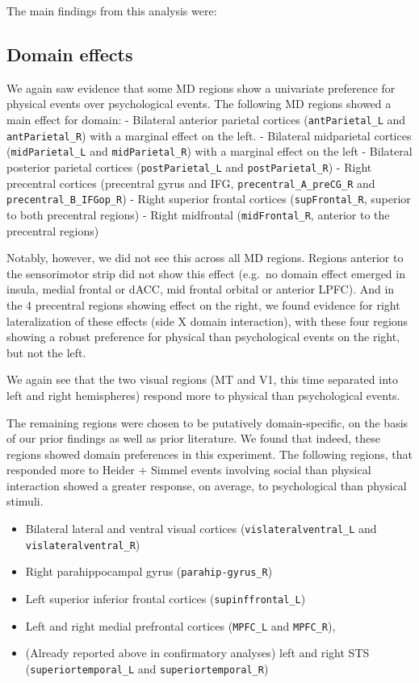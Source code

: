 \documentclass[
]{article}
\providecommand{\tightlist}{%
  \setlength{\itemsep}{0pt}\setlength{\parskip}{0pt}}
\begin{document}
The main findings from this analysis were:

\hypertarget{domain-effects-1}{%
\subsection{Domain effects}\label{domain-effects-1}}

We again saw evidence that some MD regions show a univariate preference
for physical events over psychological events. The following MD regions
showed a main effect for domain: - Bilateral anterior parietal cortices
(\texttt{antParietal\_L} and \texttt{antParietal\_R}) with a marginal
effect on the left. - Bilateral midparietal cortices
(\texttt{midParietal\_L} and \texttt{midParietal\_R}) with a marginal
effect on the left - Bilateral posterior parietal cortices
(\texttt{postParietal\_L} and \texttt{postParietal\_R}) - Right
precentral cortices (precentral gyrus and IFG,
\texttt{precentral\_A\_preCG\_R} and \texttt{precentral\_B\_IFGop\_R}) -
Right superior frontal cortices (\texttt{supFrontal\_R}, superior to
both precentral regions) - Right midfrontal (\texttt{midFrontal\_R},
anterior to the precentral regions)

Notably, however, we did not see this across all MD regions. Regions
anterior to the sensorimotor strip did not show this effect (e.g.~no
domain effect emerged in insula, medial frontal or dACC, mid frontal
orbital or anterior LPFC). And in the 4 precentral regions showing
effect on the right, we found evidence for right lateralization of these
effects (side X domain interaction), with these four regions showing a
robust preference for physical than psychological events on the right,
but not the left.

We again see that the two visual regions (MT and V1, this time separated
into left and right hemispheres) respond more to physical than
psychological events.

The remaining regions were chosen to be putatively domain-specific, on
the basis of our prior findings as well as prior literature. We found
that indeed, these regions showed domain preferences in this experiment.
The following regions, that responded more to Heider + Simmel events
involving social than physical interaction showed a greater response, on
average, to psychological than physical stimuli.

\begin{itemize}
\tightlist
\item
  Bilateral lateral and ventral visual cortices
  (\texttt{vislateralventral\_L} and \texttt{vislateralventral\_R})
\item
  Right parahippocampal gyrus (\texttt{parahip-gyrus\_R})
\item
  Left superior inferior frontal cortices (\texttt{supinffrontal\_L})
\item
  Left and right medial prefrontal cortices (\texttt{MPFC\_L} and
  \texttt{MPFC\_R}),
\item
  (Already reported above in confirmatory analyses) left and right STS
  (\texttt{superiortemporal\_L} and \texttt{superiortemporal\_R})
\end{itemize}
\end{document}
